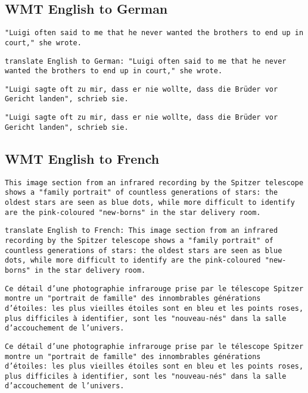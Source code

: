 \documentclass[twoside,11pt]{article}
\begin{document}
\subsection{WMT English to German}
\begin{description}[leftmargin=0.5cm]
\item[Original input:] \texttt{"Luigi often said to me that he never wanted the brothers to end up in court," she wrote.}
\item[Processed input:] \texttt{translate English to German:\ "Luigi often said to me that he never wanted the brothers to end up in court," she wrote.}
\item[Original target:] \texttt{"Luigi sagte oft zu mir, dass er nie wollte, dass die Brüder vor Gericht landen", schrieb sie.}
\item[Processed target:] \texttt{"Luigi sagte oft zu mir, dass er nie wollte, dass die Brüder vor Gericht landen", schrieb sie.}
\end{description}

\subsection{WMT English to French}
\begin{description}[leftmargin=0.5cm]
\item[Original input:] \texttt{This image section from an infrared recording by the Spitzer telescope shows a "family portrait" of countless generations of stars:\ the oldest stars are seen as blue dots, while more difficult to identify are the pink-coloured "new-borns" in the star delivery room.}
\item[Processed input:] \texttt{translate English to French:\ This image section from an infrared recording by the Spitzer telescope shows a "family portrait" of countless generations of stars:\ the oldest stars are seen as blue dots, while more difficult to identify are the pink-coloured "new-borns" in the star delivery room.}
\item[Original target:] \texttt{Ce détail d'une photographie infrarouge prise par le télescope Spitzer montre un "portrait de famille" des innombrables générations d'étoiles:\ les plus vieilles étoiles sont en bleu et les points roses, plus difficiles à identifier, sont les "nouveau-nés" dans la salle d'accouchement de l'univers.}
\item[Processed target:] \texttt{Ce détail d'une photographie infrarouge prise par le télescope Spitzer montre un "portrait de famille" des innombrables générations d'étoiles:\ les plus vieilles étoiles sont en bleu et les points roses, plus difficiles à identifier, sont les "nouveau-nés" dans la salle d'accouchement de l'univers.}
\end{description}
\end{document}
